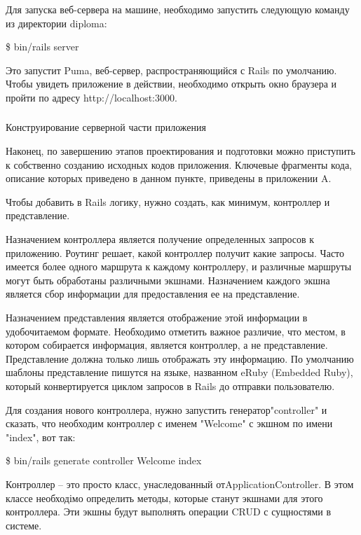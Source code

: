 Для запуска веб-сервера на машине, необходимо запустить следующую команду из директории diploma:

\begin{flushleft}
  \qquad\qquad\qquad \$ bin/rails server
\end{flushleft}

Это запустит Puma, веб-сервер, распространяющийся с Rails по умолчанию. Чтобы увидеть приложение в действии, необходимо
открыть окно браузера и пройти по адресу http://localhost:3000.

\subsubsection{} Конструирование серверной части приложения
\label{sec:design:server:development}

Наконец, по завершению этапов проектирования и подготовки можно приступить к собственно созданию исходных кодов
приложения. Ключевые фрагменты кода, описание которых приведено в данном пункте, приведены в приложении A.

Чтобы добавить в Rails логику, нужно создать, как минимум, контроллер и представление.

Назначением контроллера является получение определенных запросов к приложению. Роутинг решает, какой контроллер получит
какие запросы. Часто имеется более одного маршрута к каждому контроллеру, и различные маршруты могут быть обработаны
различными экшнами. Назначением каждого экшна является сбор информации для предоставления ее на представление.

Назначением представления является отображение этой информации в удобочитаемом формате. Необходимо отметить важное различие,
что местом, в котором собирается информация, является контроллер, а не представление. Представление должна только лишь
отображать эту информацию. По умолчанию шаблоны представление пишутся на языке, названном eRuby (Embedded Ruby),
который конвертируется циклом запросов в Rails до отправки пользователю.

Для создания нового контроллера, нужно запустить генератор\linebreak"controller" и сказать, что необходим контроллер с именем
"Welcome" с экшном по имени "index", вот так:

\begin{flushleft}
  \qquad\qquad\qquad \$ bin/rails generate controller Welcome index
\end{flushleft}

Контроллер -- это просто класс, унаследованный от\linebreak ApplicationController. В этом классе необходімо определить методы,
которые станут экшнами для этого контроллера. Эти экшны будут выполнять операции CRUD с сущностями в системе.

